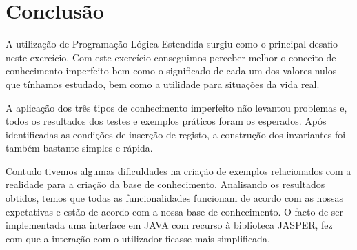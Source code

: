 \chapter{Conclusão}

A utilização de Programação Lógica Estendida surgiu como o principal desafio neste exercício. Com este exercício conseguimos perceber melhor o conceito de conhecimento imperfeito bem como o significado de cada um dos valores nulos que tínhamos estudado, bem como a utilidade para situações da vida real.

A aplicação dos três tipos de conhecimento imperfeito não levantou problemas e, todos os resultados dos testes e exemplos práticos foram os esperados. Após identificadas as condições de inserção de registo, a construção dos invariantes foi também bastante simples e rápida. 

 Contudo tivemos algumas dificuldades na criação de exemplos relacionados com a realidade para a criação da base de conhecimento. Analisando os resultados obtidos, temos que todas as funcionalidades funcionam de acordo com as nossas expetativas e estão de acordo com a nossa base de conhecimento. O facto de ser implementada uma interface em JAVA com recurso à biblioteca JASPER, fez com que a interação com o utilizador ficasse mais simplificada. 



